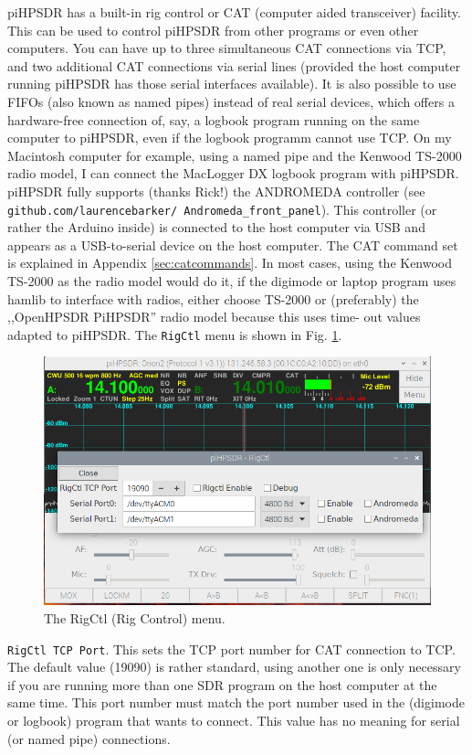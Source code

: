 \documentclass[12pt]{book}
\def\rett#1{\texttt{\color{red}#1}}
\def\bltt#1{\texttt{\color{blue}#1}}
\begin{document}
piHPSDR has a built-in rig control or CAT (computer aided transceiver) facility. This can be used to control 
piHPSDR from
other programs or even other computers. You can have up to three simultaneous CAT connections via TCP, and 
two additional CAT
connections via serial lines (provided the host computer running piHPSDR has those serial interfaces 
available). It is
also possible to use FIFOs (also known as named pipes) instead of real serial devices, which offers a 
hardware-free connection
of, say, a logbook program running on the same computer to piHPSDR, even if the logbook programm cannot use 
TCP. On my Macintosh computer for example, using a named pipe and the Kenwood TS-2000 radio model,
I can connect the MacLogger DX logbook program with piHPSDR.
piHPSDR fully supports (thanks Rick!) the ANDROMEDA controller (see \texttt{github.com/laurencebarker/
Andromeda\_front\_panel}).
This controller (or rather the Arduino inside) is connected to the host computer via USB and appears as a 
USB-to-serial
device on the host computer. The CAT command set is explained in Appendix \ref{sec:catcommands}. In most 
cases, using
the Kenwood TS-2000 as the radio model would do it, if the digimode or laptop program uses hamlib to 
interface with
radios, either choose TS-2000 or (preferably) the ,,OpenHPSDR PiHPSDR'' radio model because this uses time-
out values
adapted to piHPSDR. The \bltt{RigCtl} menu is shown in Fig. \ref{fig:RigCtlMenu}.

\begin{figure}[ht]
\center
\includegraphics[width=12cm]{RigCtlMenu.png}
\caption{The RigCtl (Rig Control) menu.}
\label{fig:RigCtlMenu}
\end{figure}

\rett{RigCtl TCP Port}. This sets the TCP port number for CAT connection to TCP. The default value (19090) 
is rather standard,
using another one is only necessary if you are running more than one SDR program on the host computer at the 
same time.
This port number must match the port number used in the (digimode or logbook) program that wants to connect. 
This value
has no meaning for serial (or named pipe) connections.
\end{document}
